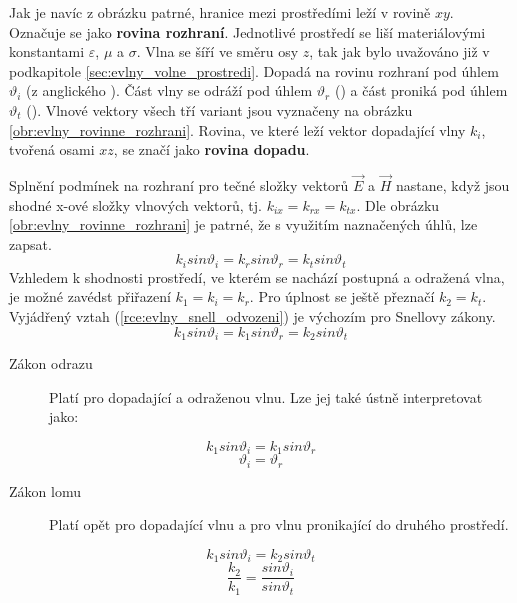Jak je navíc z obrázku patrné, hranice mezi prostředími leží v rovině $xy$. Označuje se jako {\bf rovina rozhraní}. Jednotlivé prostředí se liší materiálovými konstantami $\varepsilon$, $\mu$ a $\sigma$. Vlna se šíří ve směru osy $z$, tak jak bylo uvažováno již v podkapitole \ref{sec:evlny_volne_prostredi}. Dopadá na rovinu rozhraní pod úhlem $\vartheta_{i}$ (z anglického ). Část vlny se odráží pod úhlem $\vartheta_{r}$ () a část proniká pod úhlem $\vartheta_{t}$ (). Vlnové vektory všech tří variant jsou vyznačeny na obrázku \ref{obr:evlny_rovinne_rozhrani}. Rovina, ve které leží vektor dopadající vlny $k_{i}$, tvořená osami $xz$, se značí jako {\bf rovina dopadu}.

Splnění podmínek na rozhraní pro tečné složky vektorů $\vec E$ a $\vec H$ nastane, když jsou shodné x-ové složky vlnových vektorů, tj. $k_{ix} = k_{rx} = k_{tx}$. Dle obrázku \ref{obr:evlny_rovinne_rozhrani} je patrné, že s využitím naznačených úhlů, lze zapsat.
\begin{displaymath}
	k_{i}sin\vartheta_{i} = k_{r}sin\vartheta_{r} = k_{t}sin\vartheta_{t}
\end{displaymath}
Vzhledem k shodnosti prostředí, ve kterém se nachází postupná a odražená vlna, je možné zavédst přiřazení $k_{1} = k_{i} = k_{r}$. Pro úplnost se ještě přeznačí $k_{2} = k_{t}$. Vyjádřený vztah (\ref{rce:evlny_snell_odvozeni}) je výchozím pro Snellovy zákony.
\begin{equation}
	k_{1}sin\vartheta_{i} = k_{1}sin\vartheta_{r} = k_{2}sin\vartheta_{t}
	\label{rce:evlny_snell_odvozeni}
\end{equation}
\begin{description}
\item[Zákon odrazu] Platí pro dopadající a odraženou vlnu. Lze jej také ústně interpretovat jako:\hspace{2cm} 
\end{description}
\begin{displaymath}
	k_{1}sin\vartheta_{i} = k_{1}sin\vartheta_{r}
\end{displaymath}
\begin{equation}
	\vartheta_{i} = \vartheta_{r}
	\label{rce:evlny_zakon_odrazu}
\end{equation}
\begin{description}
\item[Zákon lomu] Platí opět pro dopadající vlnu a pro vlnu pronikající do druhého prostředí.
\end{description}
\begin{displaymath}
	k_{1}sin\vartheta_{i} = k_{2}sin\vartheta_{t}
\end{displaymath}
\begin{equation}
	\frac{k_{2}}{k_{1}} = \frac{sin\vartheta_{i}}{sin\vartheta_{t}}
	\label{rce:evlny_zakon_lomu}
\end{equation}

